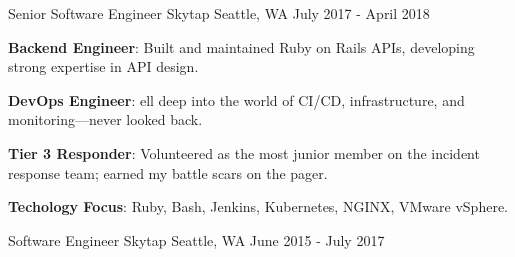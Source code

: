 \begin{cventries}
  \cventry
    {Senior Software Engineer} %
    {Skytap} %
    {Seattle, WA} %
    {July 2017 - April 2018} %
    {
      \begin{cvitems} %
        \item {\textbf{Backend Engineer}: Built and maintained Ruby on Rails APIs, developing strong expertise in API design.}
        \item {\textbf{DevOps Engineer}: ell deep into the world of CI/CD, infrastructure, and monitoring—never looked back.}
        \item {\textbf{Tier 3 Responder}: Volunteered as the most junior member on the incident response team; earned my battle scars on the pager.}
        \item {\textbf{Techology Focus}: Ruby, Bash, Jenkins, Kubernetes, NGINX, VMware vSphere.}
      \end{cvitems}
    }

  \cventry
    {Software Engineer} %
    {Skytap} %
    {Seattle, WA} %
    {June 2015 - July 2017} %
    {}

\end{cventries}
